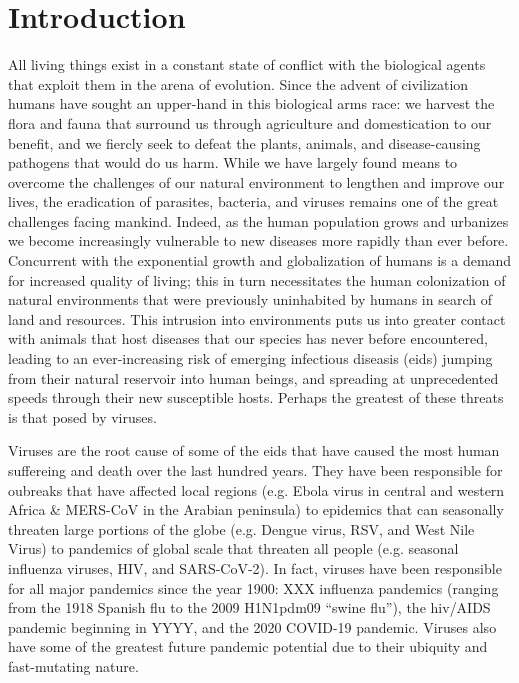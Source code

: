 \chapter{Introduction}\label{ch:introduction}


All living things exist in a constant state of conflict with the biological agents that exploit them in the arena of evolution.
Since the advent of civilization humans have sought an upper-hand in this biological arms race: we harvest the flora and fauna that surround us through agriculture and domestication to our benefit, and we fiercly seek to defeat the plants, animals, and disease-causing pathogens that would do us harm.
While we have largely found means to overcome the challenges of our natural environment to lengthen and improve our lives, the eradication of parasites, bacteria, and viruses remains one of the great challenges facing mankind.
Indeed, as the human population grows and urbanizes we become increasingly vulnerable to new diseases more rapidly than ever before.
Concurrent with the exponential growth and globalization of humans is a demand for increased quality of living; this in turn necessitates the human colonization of natural environments that were previously uninhabited by humans in search of land and resources.
This intrusion into environments puts us into greater contact with animals that host diseases that our species has never before encountered, leading to an ever-increasing risk of emerging infectious diseasis (\gls{eid}s) jumping from their natural reservoir into human beings, and spreading at unprecedented speeds through their new susceptible hosts.
Perhaps the greatest of these threats is that posed by viruses.

Viruses are the root cause of some of the \gls{eid}s that have caused the most human suffereing and death over the last hundred years.
They have been responsible for oubreaks that have affected local regions (e.g. Ebola virus in central and western Africa \& MERS-CoV in the Arabian peninsula) to epidemics that can seasonally threaten large portions of the globe (e.g. Dengue virus, RSV, and West Nile Virus) to pandemics of global scale that threaten all people (e.g. seasonal influenza viruses, HIV, and SARS-CoV-2).
In fact, viruses have been responsible for all major pandemics since the year 1900: XXX influenza pandemics (ranging from the 1918 Spanish flu to the 2009 H1N1pdm09 ``swine flu''), the \gls{hiv}/AIDS pandemic beginning in YYYY, and the 2020 COVID-19 pandemic.
Viruses also have some of the greatest future pandemic potential due to their ubiquity and fast-mutating nature.

